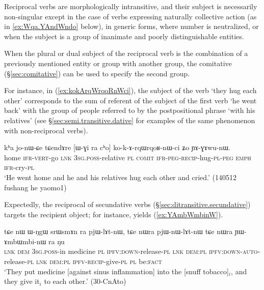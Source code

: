 Reciprocal verbs are morphologically intransitive, and their subject is necessarily non-singular except in the case of verbs expressing naturally collective action \citep[123--127]{kemmer93middle} (as in \ref{ex:Wqa.YAndWndo} below), in generic forms, where number is neutralized, or when the subject is a group of inanimate and poorly distinguishable entities. 

When the plural or dual subject of the reciprocal verb is the combination of a previously mentioned entity or group with another group, the comitative  (§\ref{sec:comitative})  can be used to specify the second group. 

For instance, in (\ref{ex:kokArqWrqoRnWci}), the subject of the verb  `they hug each other' corresponds to the sum of referent of the subject of the first verb  `he went back' with the group of people referred to by the postpositional phrase  `with his relatives' (see §\ref{sec:semi.transitive.dative} for examples of the same phenomenon with non-reciprocal verbs).

\begin{exe}
\ex \label{ex:kokArqWrqoRnWci}
\gll   kʰa jo-nɯ-ɕe tɕendɤre [ɯ-ɣi ra cʰo] ko-k-ɤ-rqɯ\redp{}rqoʁ-nɯ-ci ʑo ɲɤ-ɣɤwu-nɯ. \\
home \textsc{ifr}-\textsc{vert}-go \textsc{lnk} \textsc{3sg}.\textsc{poss}-relative \textsc{pl} \textsc{comit} \textsc{ifr}-\textsc{peg}-\textsc{recip}-hug-\textsc{pl}-\textsc{peg} \textsc{emph} \textsc{ifr}-cry-\textsc{pl} \\
\glt `He went home and he and his relatives hug each other and cried.' (140512 fushang he yaomo1)
\end{exe}

Expectedly, the reciprocal of secundative verbs (§\ref{sec:ditransitive.secundative}) targets the recipient object; for instance,  yields  (\ref{ex:YAmbWmbinW}).

\begin{exe}
\ex \label{ex:YAmbWmbinW}
\gll tɕe nɯ ɯ-ŋgɯ srɯsmɤn ra pjɯ-lɤt-nɯ, tɕe nɯra pjɯ-nɯ-lɤt-nɯ tɕe nɯra ɲɯ-ɤmbɯ\redp{}mbi-nɯ ra ŋu \\
\textsc{lnk} \textsc{dem} \textsc{3sg}.\textsc{poss}-in medicine \textsc{pl} \textsc{ipfv}:\textsc{down}-release-\textsc{pl} \textsc{lnk} \textsc{dem}:\textsc{pl} \textsc{ipfv}:\textsc{down}-\textsc{auto}-release-\textsc{pl} \textsc{lnk} \textsc{dem}:\textsc{pl} \textsc{ipfv}-\textsc{recip}-give-\textsc{pl} \textsc{pl} be:\textsc{fact} \\
\glt `They put medicine [against sinus inflammation] into the [snuff tobacco]$_i$, and they give it$_i$ to each other.' (30-CnAto)
\end{exe}
 
